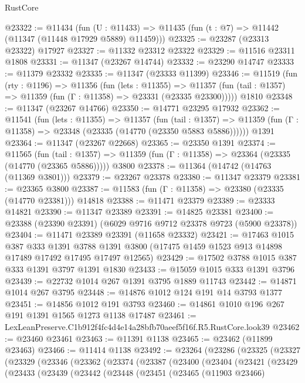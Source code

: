 \begin{lexlean}{RustCore}
\begin{coremodule}
@23322 := @11434
    (fun (U : @11433) => @11435 (fun (t : @7) => @11442 (@11347 (@11448 @17929 @5889) @11459)))
@23325 := @23287 (@23313 @23322) @17927
@23327 := @11332 @23312 @23322
@23329 := @11516 @23311 @1808
@23331 := @11347 (@23267 @14744)
@23332 := @23290 @14747
@23333 := @11379 @23332
@23335 := @11347 (@23333 @11399)
@23346 := @11519
    (fun (rty : @1196) =>
    @11356
      (fun (lets : @11355) =>
      @11357 (fun (tail : @1357) => @11359 (fun (Γ : @11358) => @23331 (@23335 @23300)))))
    @1810
@23348 := @11347 (@23267 @14766)
@23350 := @14771 @23295 @17932
@23362 := @11541
    (fun (lets : @11355) =>
    @11357
      (fun (tail : @1357) =>
      @11359 (fun (Γ : @11358) => @23348 (@23335 (@14770 (@23350 @5883 @5886))))))
    @1391
@23364 := @11347 (@23267 @22668)
@23365 := @23350 @1391
@23374 := @11565
    (fun (tail : @1357) => @11359 (fun (Γ : @11358) => @23364 (@23335 (@14770 (@23365 @5886)))))
    @3800
@23378 := @11364 (@14742 (@14763 (@11369 @3801)))
@23379 := @23267 @23378
@23380 := @11347 @23379
@23381 := @23365 @3800
@23387 := @11583 (fun (Γ : @11358) => @23380 (@23335 (@14770 @23381))) @14818
@23388 := @11471 @23379
@23389 := @23333 @14821
@23390 := @11347 @23389
@23391 := @14825 @23381
@23400 := @23388 (@23390 @23391) (@6029 @9716 @9712 @23378 @9723 (@5900 @23378))
@23404 := @11471 @23389 @23391 (@11658 @23332)
@23421 := @17463
    @1015
    @387
    @333
    @1391
    @3788
    @1391
    @3800
    (@17475 @1459 @1523 @913 @14898 @17489 @17492 @17495 @17497 @12565)
@23429 := @17502 @3788 @1015 @387 @333 @1391 @3797 @1391 @1830
@23433 := @15059 @1015 @333 @1391 @3796
@23439 := @22732 @1014 @267 @1391 @3795 @1889 @11743
@23442 := @14871 @1014 @267 @3795
@23448 := @14876 @1012 @124 @191 @14 @3793 @1377
@23451 := @14856 @1012 @191 @3793
@23460 := @14861 @1010 @196 @267 @191 @1391 @1565 @1273 @1138 @17487
@23461 := LexLeanPreserve.C1b912f4fc4d4e14a28bfb70aeef5f16f.R5.RustCore.look39
@23462 := @23460 @23461
@23463 := @11391 @1138
@23465 := @23462 (@11899 @23463)
@23466 := @11414 @1138
@23492 := @23264
    (@23286
      (@23325
        (@23327
          (@23329
            (@23346
              (@23362
                (@23374
                  (@23387
                    (@23400
                      (@23404
                        (@23421
                          (@23429
                            (@23433
                              (@23439
                                (@23442
                                  (@23448
                                    (@23451
                                      (@23465
                                        (@11903 @23466)

\end{coremodule}
\end{lexlean}

